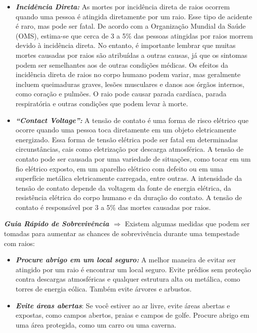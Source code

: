 \documentclass[a4paper, 12pt, onecolumn,singlespacing]{article}
\begin{document}
\begin{itemize}
\begin{itemize}
			\item \textbf{\textit{Incidência Direta: }}As mortes por incidência direta de raios ocorrem quando uma pessoa é atingida diretamente por um raio. Esse tipo de acidente é raro, mas pode ser fatal. De acordo com a Organização Mundial da Saúde (OMS), estima-se que cerca de 3 a 5\% das pessoas atingidas por raios morrem devido à incidência direta. No entanto, é importante lembrar que muitas mortes causadas por raios são atribuídas a outras causas, já que os sintomas podem ser semelhantes aos de outras condições médicas. Os efeitos da incidência direta de raios no corpo humano podem variar, mas geralmente incluem queimaduras graves, lesões musculares e danos aos órgãos internos, como coração e pulmões. O raio pode causar parada cardíaca, parada respiratória e outras condições que podem levar à morte.
			
			\item \textbf{\textit{``Contact Voltage'': }} A tensão de contato é uma forma de risco elétrico que ocorre quando uma pessoa toca diretamente em um objeto eletricamente energizado. Essa forma de tensão elétrica pode ser fatal em determinadas circunstâncias, cais como eletrização por descarga atmosférica.	A tensão de contato pode ser causada por uma variedade de situações, como tocar em um fio elétrico exposto, em um aparelho elétrico com defeito ou em uma superfície metálica eletricamente carregada, entre outras. A intensidade da tensão de contato depende da voltagem da fonte de energia elétrica, da resistência elétrica do corpo humano e da duração do contato. A tensão de contato é responsável por 3 a 5\% das mortes causadas por raios.
			
		\end{itemize}
		
		\subitem \textbf{\textit{Guia Rápido de Sobrevivência $\Rightarrow$}} Existem algumas medidas que podem ser tomadas para aumentar as chances de sobrevivência durante uma tempestade com raios:
		
		\begin{itemize}
			\item \textbf{\textit{Procure abrigo em um local seguro:}} A melhor maneira de evitar ser atingido por um raio é encontrar um local seguro. Evite prédios sem proteção contra descargas atmosféricas e qualquer estrutura alta ou metálica, como torres de energia eólica. Também evite árvores e arbustos.
			\item \textbf{\textit{Evite áreas abertas}}: Se você estiver ao ar livre, evite áreas abertas e expostas, como campos abertos, praias e campos de golfe. Procure abrigo em uma área protegida, como um carro ou uma caverna.
			

\end{itemize}
\end{itemize}
\end{document}
